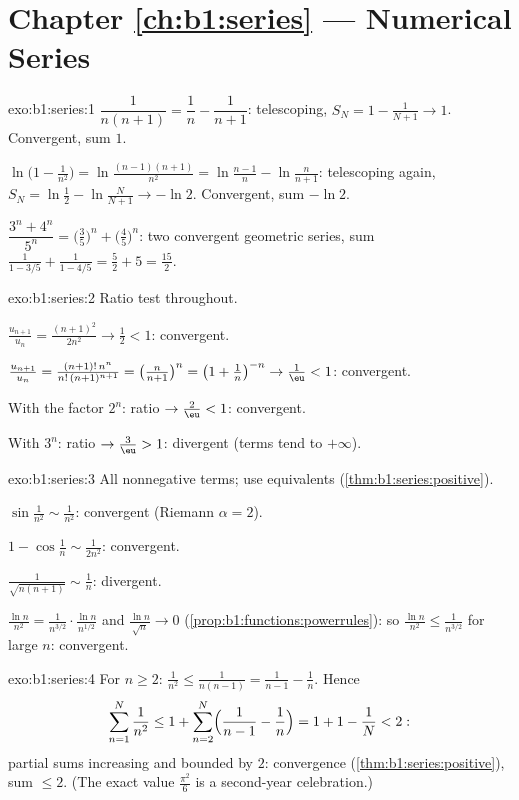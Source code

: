 \section*{Chapter \ref{ch:b1:series} --- Numerical Series}

\begin{solution}{exo:b1:series:1}
$\dfrac{1}{n(n+1)} = \dfrac1n - \dfrac{1}{n+1}$: telescoping, $S_N =
1 - \frac{1}{N+1} \to 1$. Convergent, sum $1$.

$\ln\bigl(1 - \frac{1}{n^2}\bigr) = \ln\frac{(n-1)(n+1)}{n^2} =
\ln\frac{n-1}{n} - \ln\frac{n}{n+1}$: telescoping again, $S_N =
\ln\frac12 - \ln\frac{N}{N+1} \to -\ln 2$. Convergent, sum $-\ln 2$.

$\dfrac{3^n + 4^n}{5^n} = \bigl(\frac35\bigr)^n +
\bigl(\frac45\bigr)^n$: two convergent geometric series, sum
$\frac{1}{1 - 3/5} + \frac{1}{1 - 4/5} = \frac52 + 5 = \frac{15}{2}$.
\end{solution}

\begin{solution}{exo:b1:series:2}
Ratio test throughout.

$\frac{u_{n+1}}{u_n} = \frac{(n+1)^2}{2n^2} \to \frac12 < 1$:
convergent.

$\frac{u_{n+1}}{u_n} = \frac{(n+1)!\,n^n}{n!\,(n+1)^{n+1}} =
\bigl(\frac{n}{n+1}\bigr)^n = \bigl(1 + \frac1n\bigr)^{-n} \to
\frac1\eu < 1$: convergent.

With the factor $2^n$: ratio $\to \frac2\eu < 1$: convergent.

With $3^n$: ratio $\to \frac3\eu > 1$: divergent (terms tend to
$+\infty$).
\end{solution}

\begin{solution}{exo:b1:series:3}
All nonnegative terms; use equivalents
(\cref{thm:b1:series:positive}).

$\sin\frac{1}{n^2} \sim \frac{1}{n^2}$: convergent (Riemann $\alpha
= 2$).

$1 - \cos\frac1n \sim \frac{1}{2n^2}$: convergent.

$\frac{1}{\sqrt{n(n+1)}} \sim \frac1n$: divergent.

$\frac{\ln n}{n^2} = \frac{1}{n^{3/2}}\cdot\frac{\ln n}{n^{1/2}}$
and $\frac{\ln n}{\sqrt n} \to 0$
(\cref{prop:b1:functions:powerrules}): so $\frac{\ln n}{n^2} \leq
\frac{1}{n^{3/2}}$ for large $n$: convergent.
\end{solution}

\begin{solution}{exo:b1:series:4}
For $n \geq 2$: $\frac{1}{n^2} \leq \frac{1}{n(n-1)} =
\frac{1}{n-1} - \frac1n$. Hence
\[
\sum_{n=1}^{N} \frac{1}{n^2} \leq 1 + \sum_{n=2}^{N}
\Bigl(\frac{1}{n-1} - \frac1n\Bigr) = 1 + 1 - \frac1N < 2 :
\]
partial sums increasing and bounded by $2$: convergence
(\cref{thm:b1:series:positive}), sum $\leq 2$. (The exact value
$\frac{\pi^2}{6}$ is a second-year celebration.)
\end{solution}

